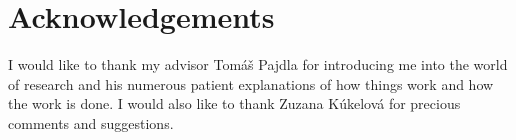 
\mbox{}\vfill

{\let\clearpage\relax\par \chapter*{Acknowledgements}}

I would like to thank my advisor Tomáš Pajdla for introducing me into the world of research and his numerous patient explanations of how things work and how the work is done. 
I would also like to thank Zuzana Kúkelová for precious comments and suggestions.

\endinput